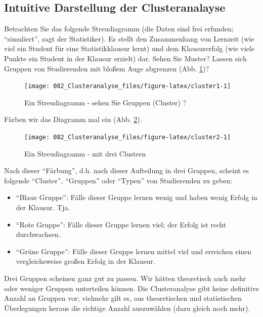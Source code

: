 \documentclass[12pt,ngerman,]{book}
\theoremstyle{definition}
\theoremstyle{definition}
\theoremstyle{remark}
\begin{document}
\subsection{Intuitive Darstellung der
Clusteranalayse}\label{intuitive-darstellung-der-clusteranalayse}

Betrachten Sie das folgende Streudiagramm (die Daten sind frei erfunden;
``simuliert'', sagt der Statistiker). Es stellt den Zusammenhang von
Lernzeit (wie viel ein Student für eine Statistikklausur lernt) und dem
Klausurerfolg (wie viele Punkte ein Student in der Klausur erzielt) dar.
Sehen Sie Muster? Lassen sich Gruppen von Studierenden mit bloßem Auge
abgrenzen (Abb. \ref{fig:cluster1})?

\begin{figure}

{\centering \texttt{[image: 082\_Clusteranalyse\_files/figure-latex/cluster1-1]} 

}

\caption{Ein Streudiagramm - sehen Sie Gruppen (Cluster) ?}\label{fig:cluster1}
\end{figure}

Färben wir das Diagramm mal ein (Abb. \ref{fig:cluster2}).

\begin{figure}

{\centering \texttt{[image: 082\_Clusteranalyse\_files/figure-latex/cluster2-1]} 

}

\caption{Ein Streudiagramm - mit drei Clustern}\label{fig:cluster2}
\end{figure}

Nach dieser ``Färbung'', d.h. nach dieser Aufteilung in drei Gruppen,
scheint es folgende ``Cluster'', ``Gruppen'' oder ``Typen'' von
Studierenden zu geben:

\begin{itemize}
\item
  ``Blaue Gruppe'': Fälle dieser Gruppe lernen wenig und haben wenig
  Erfolg in der Klausur. Tja.
\item
  ``Rote Gruppe'': Fälle dieser Gruppe lernen viel; der Erfolg ist recht
  durchwachsen.
\item
  ``Grüne Gruppe'': Fälle dieser Gruppe lernen mittel viel und erreichen
  einen vergleichsweise großen Erfolg in der Klausur.
\end{itemize}

Drei Gruppen scheinen ganz gut zu passen. Wir hätten theoretisch auch
mehr oder weniger Gruppen unterteilen können. Die Clusteranalyse gibt
keine definitive Anzahl an Gruppen vor; vielmehr gilt es, aus
theoretischen und statistischen Überlegungen heraus die richtige Anzahl
auszuwählen (dazu gleich noch mehr).
\end{document}
